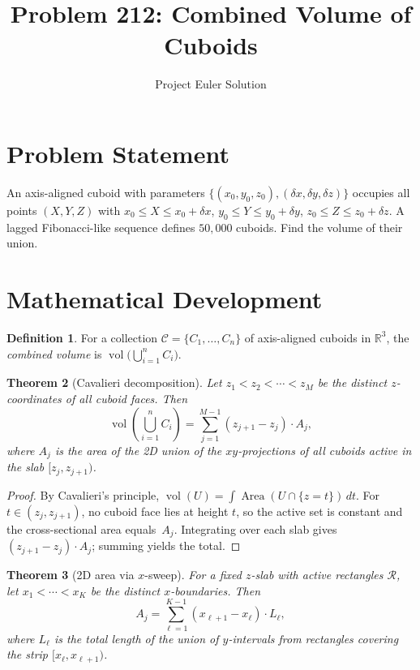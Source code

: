 \documentclass[12pt]{article}
\title{Problem 212: Combined Volume of Cuboids}
\author{Project Euler Solution}
\date{}
\newtheorem{theorem}{Theorem}
\theoremstyle{definition}
\newtheorem{definition}[theorem]{Definition}
\begin{document}
\maketitle

\section{Problem Statement}

An axis-aligned cuboid with parameters $\{(x_0, y_0, z_0), (\delta x, \delta y, \delta z)\}$ occupies all points $(X,Y,Z)$ with $x_0 \leq X \leq x_0+\delta x$, $y_0 \leq Y \leq y_0+\delta y$, $z_0 \leq Z \leq z_0+\delta z$. A lagged Fibonacci-like sequence defines $50{,}000$ cuboids. Find the volume of their union.

\section{Mathematical Development}

\begin{definition}
For a collection $\mathcal{C} = \{C_1, \ldots, C_n\}$ of axis-aligned cuboids in $\mathbb{R}^3$, the \emph{combined volume} is $\operatorname{vol}\bigl(\bigcup_{i=1}^{n} C_i\bigr)$.
\end{definition}

\begin{theorem}[Cavalieri decomposition]
Let $z_1 < z_2 < \cdots < z_M$ be the distinct $z$-coordinates of all cuboid faces. Then
\[
\operatorname{vol}\!\left(\bigcup_{i=1}^{n} C_i\right) = \sum_{j=1}^{M-1} (z_{j+1} - z_j) \cdot A_j,
\]
where $A_j$ is the area of the 2D union of the $xy$-projections of all cuboids active in the slab $[z_j, z_{j+1})$.
\end{theorem}

\begin{proof}
By Cavalieri's principle, $\operatorname{vol}(U) = \int \operatorname{Area}(U \cap \{z=t\})\,dt$. For $t \in (z_j, z_{j+1})$, no cuboid face lies at height $t$, so the active set is constant and the cross-sectional area equals~$A_j$. Integrating over each slab gives $(z_{j+1}-z_j)\cdot A_j$; summing yields the total.
\end{proof}

\begin{theorem}[2D area via $x$-sweep]
For a fixed $z$-slab with active rectangles $\mathcal{R}$, let $x_1 < \cdots < x_K$ be the distinct $x$-boundaries. Then
\[
A_j = \sum_{\ell=1}^{K-1}(x_{\ell+1}-x_\ell)\cdot L_\ell,
\]
where $L_\ell$ is the total length of the union of $y$-intervals from rectangles covering the strip $[x_\ell, x_{\ell+1})$.
\end{theorem}
\end{document}
